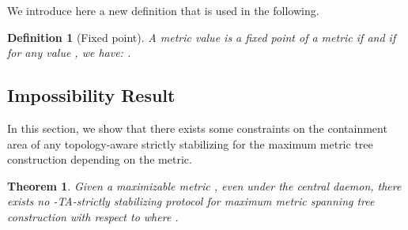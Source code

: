 \documentclass[11pt]{article}
\newtheorem{theo}{Theorem}
\newtheorem{defi}{Definition}
\newenvironment{theorem}[1]{\vspace{-0.25cm}\begin{theo}#1}{\end{theo}\vspace{-0.3cm}}
\newenvironment{definition}[1]{\vspace{-0.25cm}\begin{defi}#1}{\end{defi}\vspace{-0.3cm}}
\begin{document}
We introduce here a new definition that is used in the following.

\begin{definition}[Fixed point]
A metric value  is a \emph{fixed point} of a metric   if  and if for any value , we have: .
\end{definition}

\subsection{Impossibility Result}

In this section, we show that there exists some constraints on the containment area of any topology-aware strictly stabilizing for the maximum metric tree construction depending on the metric.

\begin{theorem}\label{th:impTAstrict}
Given a maximizable metric , even under the central daemon, there exists no -TA-strictly stabilizing protocol for maximum metric spanning tree construction with respect to  where .
\end{theorem}
\end{document}
